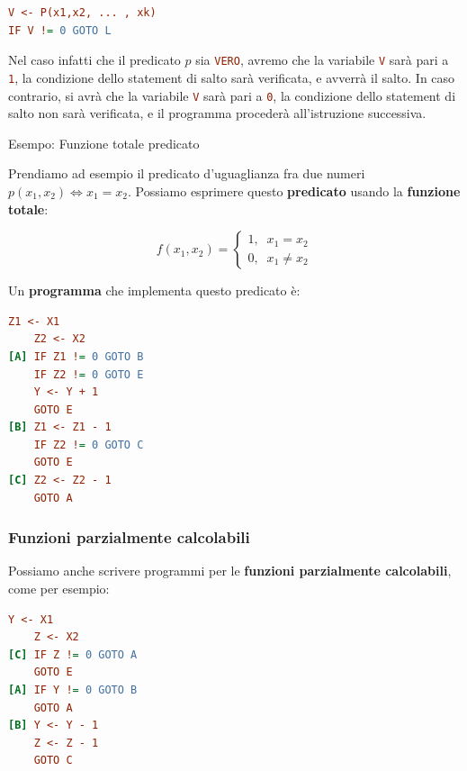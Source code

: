 \begin{lstlisting}[language=ini, label={Salto generalizzato},  caption= Macro di salto generalizzato]
V <- P(x1,x2, ... , xk)
IF V != 0 GOTO L
\end{lstlisting}

Nel caso infatti che il predicato \(p\) sia \lstinline[language=ini]{VERO}, avremo che la variabile \lstinline[language=ini]{V} sarà pari a \lstinline[language=ini]{1}, la condizione dello statement di salto sarà verificata, e avverrà il salto. In caso contrario,
si avrà che la variabile \lstinline[language=ini]{V} sarà pari a \lstinline[language=ini]{0}, la condizione dello statement di salto non sarà verificata, e il programma procederà all'istruzione successiva.
\newpage
\begin{generalbox}[colframe=azure-gradient-3!90!black]{Esempo: Funzione totale predicato}

Prendiamo ad esempio il predicato d'uguaglianza fra due numeri \(p(x_1,x_2)\iff x_1=x_2\). Possiamo esprimere questo \textbf{predicato} usando la \textbf{funzione totale}:

\begin{equation}
  f(x_1,x_2)= \begin{cases}
                1, \;\; x_1=x_2\\
                0, \;\; x_1\neq x_2
              \end{cases}
  \label{Predicato Uguaglianza Eq}
\end{equation}


Un \textbf{programma} che implementa questo predicato è:

\begin{lstlisting}[language=ini, label={Predicato Uguaglianza},  caption=Predicato logico (uguaglianza)]
    Z1 <- X1
    Z2 <- X2
[A] IF Z1 != 0 GOTO B
    IF Z2 != 0 GOTO E
    Y <- Y + 1
    GOTO E
[B] Z1 <- Z1 - 1
    IF Z2 != 0 GOTO C
    GOTO E
[C] Z2 <- Z2 - 1
    GOTO A
\end{lstlisting}
\end{generalbox}

\subsubsection{Funzioni parzialmente calcolabili}

Possiamo anche scrivere programmi per le \textbf{funzioni parzialmente calcolabili}, come per esempio:

\begin{lstlisting}[language=ini, label={Funzione Sottrazione},  caption=Funzione parzialmente calcolabile (sottrazione)]
    Y <- X1
    Z <- X2
[C] IF Z != 0 GOTO A
    GOTO E
[A] IF Y != 0 GOTO B
    GOTO A
[B] Y <- Y - 1
    Z <- Z - 1
    GOTO C
\end{lstlisting}

